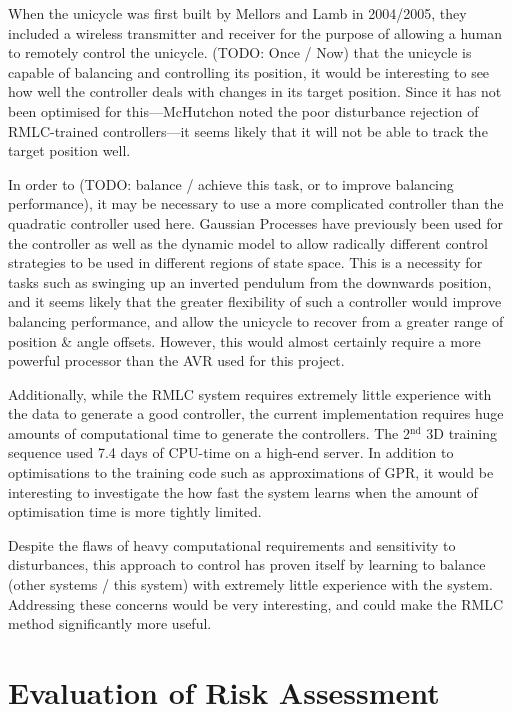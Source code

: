 \documentclass{IIBproject}
\begin{document}
When the unicycle was first built by Mellors and Lamb in 2004/2005, they
included a wireless transmitter and receiver for the purpose of allowing a
human to remotely control the unicycle. 
(TODO: Once / Now) that the unicycle is capable of balancing and controlling its
position, it would be interesting to see how well the controller deals with
changes in its target position. Since it has not been optimised for
this---McHutchon noted the poor disturbance rejection of RMLC-trained
controllers---it seems likely that it will not be able to track the target
position well.

In order to (TODO: balance / achieve this task, or to improve balancing
performance), it may be necessary to use a more complicated controller than the
quadratic controller used here. Gaussian Processes have previously been used
for the controller as well as the dynamic model to allow radically different
control strategies to be used in different regions of state space. This is a
necessity for tasks such as swinging up an inverted pendulum from the
downwards position, and it seems likely that the greater flexibility of such a
controller would improve balancing performance, and allow the unicycle to
recover from a greater range of position \& angle offsets. However, this would
almost certainly require a more powerful processor than the AVR used for this
project.


Additionally, while the RMLC system requires extremely little experience with
the data to generate a good controller, the current implementation requires
huge amounts of computational time to generate the controllers. The
2$^\textrm{nd}$ 3D training sequence used 7.4 days of CPU-time on a high-end
server. In addition to optimisations to the training code such as
approximations of GPR, it would be interesting to investigate the how fast the
system learns when the amount of optimisation time is more tightly limited.

Despite the flaws of heavy computational requirements and sensitivity to
disturbances, this approach to control has proven itself by learning to
balance (other systems / this system) with extremely little experience with
the system. Addressing these concerns would be very interesting, and could
make the RMLC method significantly more useful.




\pagebreak
\appendix

\section{Evaluation of Risk Assessment}
\end{document}
